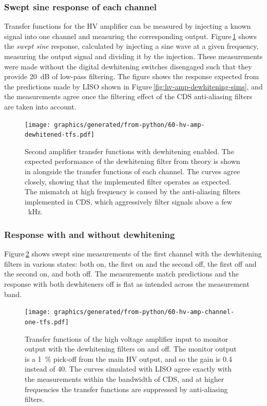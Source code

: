 \subsubsection{Swept sine response of each channel}
Transfer functions for the \gls{HV} amplifier can be measured by injecting a known signal into one channel and measuring the corresponding output. Figure\,\ref{fig:hv-amp-dewhitened-tfs} shows the \emph{swept sine} response, calculated by injecting a sine wave at a given frequency, measuring the output signal and dividing it by the injection. These measurements were made without the digital dewhitening switches disengaged such that they provide \SI{20}{\deci\bel} of low-pass filtering. The figure shows the response expected from the predictions made by \gls{LISO} shown in Figure\,\ref{fig:hv-amp-dewhitening-sims}, and the measurements agree once the filtering effect of the \gls{CDS} anti-aliasing filters are taken into account.

\begin{figure}
  \centering
  \texttt{[image: graphics/generated/from-python/60-hv-amp-dewhitened-tfs.pdf]}
  \caption[Frequency response of the high voltage amplifier's channels with dewhitening enabled]{Second amplifier transfer functions with dewhitening enabled. The expected performance of the dewhitening filter from theory is shown in  alongside the transfer functions of each channel. The curves agree closely, showing that the implemented filter operates as expected. The mismatch at high frequency is caused by the anti-aliasing filters implemented in \gls{CDS}, which aggressively filter signals above a few \SI{}{\kilo\hertz}.}
  \label{fig:hv-amp-dewhitened-tfs}
\end{figure}

\subsubsection{Response with and without dewhitening}
Figure\,\ref{fig:hv-amp-channel-one-tfs} shows swept sine measurements of the first channel with the dewhitening filters in various states: both on, the first on and the second off, the first off and the second on, and both off. The measurements match predictions and the response with both dewhiteners off is flat as intended across the measurement band.

\begin{figure}
  \centering
  \texttt{[image: graphics/generated/from-python/60-hv-amp-channel-one-tfs.pdf]}
  \caption[Transfer functions of the high voltage amplifier input to monitor output with the dewhiteners on and off]{Transfer functions of the high voltage amplifier input to monitor output with the dewhitening filters on and off. The monitor output is a \SI{1}{\percent} pick-off from the main \gls{HV} output, and so the gain is \num{0.4} instead of \num{40}. The curves simulated with \gls{LISO} agree exactly with the measurements within the bandwidth of \gls{CDS}, and at higher frequencies the transfer functions are suppressed by anti-aliasing filters.}
  \label{fig:hv-amp-channel-one-tfs}
\end{figure}

